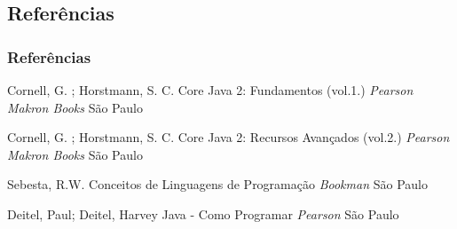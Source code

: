 \documentclass{beamer}
\begin{document}
%
%		

\subsection{Referências}

\begin{frame}
	\frametitle{Referências}
	\footnotesize{
		\begin{thebibliography}{99} %
			 Cornell, G. ; Horstmann, S. C. 
			\newblock Core Java 2: Fundamentos (vol.1.)
			\newblock \emph{Pearson Makron Books} São Paulo
		\end{thebibliography}
		\begin{thebibliography}{99} %
			 Cornell, G. ; Horstmann, S. C. 
			\newblock Core Java 2: Recursos Avançados (vol.2.)
			\newblock \emph{Pearson Makron Books} São Paulo
		\end{thebibliography}
		\begin{thebibliography}{99} %
			 Sebesta, R.W.
			\newblock Conceitos de Linguagens de Programação
			\newblock \emph{Bookman} São Paulo
		\end{thebibliography}
		\begin{thebibliography}{99} %
			 Deitel, Paul; Deitel, Harvey
			\newblock Java - Como Programar
			\newblock \emph{Pearson} São Paulo
		\end{thebibliography}
	}
\end{frame}

\end{document}
